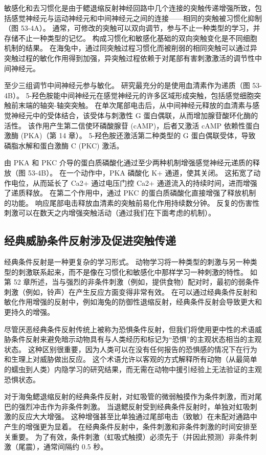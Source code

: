 敏感化和去习惯化是由于鳃退缩反射神经回路中几个连接的突触传递增强所致，包括感觉神经元与运动神经元和中间神经元之间的连接——相同的突触被习惯化抑制（图 53-4A）。 通常，可修改的突触可以双向调节，参与不止一种类型的学习，并存储不止一种类型的记忆。 构成习惯化和敏感化基础的双向突触变化是不同细胞机制的结果。 在海兔中，通过同突触过程习惯化而被削弱的相同突触可以通过异突触过程的敏化作用得到加强，异突触过程依赖于对尾部有害刺激激活的调节性中间神经元。

至少三组调节中间神经元参与敏化。 研究最充分的是使用血清素作为递质（图 53-4B）。 5-羟色胺能中间神经元在感觉神经元的许多区域形成突触，包括感觉细胞突触前末端的轴突-轴突突触。 在单次尾部电击后，从中间神经元释放的血清素与感觉神经元中的受体结合，该受体与刺激性 G 蛋白偶联，从而增加腺苷酸环化酶的活性。 该作用产生第二信使环磷酸腺苷 (cAMP)，后者又激活 cAMP 依赖性蛋白激酶 (PKA)（第 14 章）。 5-羟色胺还激活第二种类型的 G 蛋白偶联受体，导致磷脂水解和蛋白激酶 C (PKC) 激活。

由 PKA 和 PKC 介导的蛋白质磷酸化通过至少两种机制增强感觉神经元递质的释放（图 53-4B）。 在一个动作中，PKA 磷酸化 K+ 通道，使其关闭。 这拓宽了动作电位，从而延长了 Ca2+ 通过电压门控 Ca2+ 通道流入的持续时间，进而增强了递质释放。 在第二个作用中，通过 PKC 的蛋白质磷酸化直接增强了释放机制的功能。 响应尾部电击释放血清素的突触前易化作用持续数分钟。 反复的伤害性刺激可以在数天之内增强突触活动（通过我们在下面考虑的机制）。

\subsection{经典威胁条件反射涉及促进突触传递}
经典条件反射是一种更复杂的学习形式。 动物学习将一种类型的刺激与另一种类型的刺激联系起来，而不是像在习惯化和敏感化中那样学习一种刺激的特性。 如第 52 章所述，当与强烈的非条件刺激（例如，提供食物）配对时，最初的弱条件刺激（例如，铃声）在产生反应方面变得非常有效。 在可以通过经典条件反射和敏化作用增强的反射中，例如海兔的防御性退缩反射，经典条件反射会导致更大和更持久的增强。

尽管厌恶经典条件反射传统上被称为恐惧条件反射，但我们将使用更中性的术语威胁条件反射来避免暗示动物具有与人类经历和标记为“恐惧”的主观状态相当的主观状态。 这种区别很重要，因为人类可以在没有任何报告的恐惧感的情况下在行为和生理上对威胁做出反应。 这个术语允许以客观的方式解释所有动物（从最简单的蠕虫到人类）内隐学习的研究结果，而无需在动物中援引经验上无法验证的主观恐惧状态。

对于海兔鳃退缩反射的经典条件反射，对虹吸管的微弱触摸作为条件刺激，而对尾巴的强烈冲击作为非条件刺激。 当退鳃反射受到经典条件反射时，单独对虹吸刺激的反应大大增强。 这种增强甚至比单独通过尾部电击（致敏）在未配对通路中产生的增强更为显着。 在经典条件反射中，条件刺激和非条件刺激的时间安排至关重要。 为了有效，条件刺激（虹吸式触摸）必须先于（并因此预测）非条件刺激（尾震），通常间隔约 0.5 秒。

